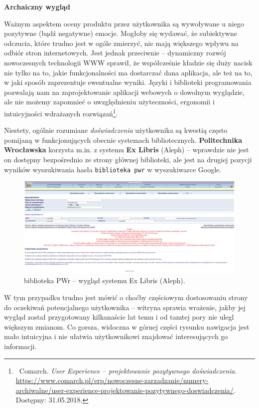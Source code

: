 \documentclass[12pt, a4paper]{article}
\begin{document}
\noindent\textbf{Archaiczny wygląd}\\\vspace{-0.35cm}

Ważnym aspektem oceny produktu przez użytkownika są wywoływane u niego pozytywne (bądź negatywne) emocje. Mogłoby się wydawać, że subiektywne odczucia, które trudno jest w ogóle zmierzyć, nie mają większego wpływu na odbiór stron internetowych. Jest jednak przeciwnie -- dynamiczny rozwój nowoczesnych technologii WWW sprawił, że współcześnie kładzie się duży nacisk nie tylko na to, jakie funkcjonalności ma dostarczać dana aplikacja, ale też na to, w jaki sposób zaprezentuje ewentualne wyniki. Języki i biblioteki programowania pozwalają nam na zaprojektowanie aplikacji webowych o dowolnym wyglądzie, ale nie możemy zapomnieć o uwzględnieniu użyteczności, ergonomii i intuicyjności wdrażanych rozwiązań\footnote{\ Comarch. \textit{User Experience -- projektowanie pozytywnego doświadczenia}.\\\url{https://www.comarch.pl/erp/nowoczesne-zarzadzanie/numery-archiwalne/user-experience-projektowanie-pozytywnego-doswiadczenia/}. Dostępny: 31.05.2018.}. 

Niestety, ogólnie rozumiane \textit{doświadczenia} użytkownika są kwestią często pomijaną w funkcjonujących obecnie systemach bibliotecznych. \textbf{Politechnika Wrocławska} korzysta m.in. z systemu \textbf{Ex Libris} (Aleph) -- wprawdzie nie jest on dostępny bezpośrednio ze strony głównej biblioteki, ale jest na drugiej pozycji wyników wyszukiwania hasła \texttt{biblioteka pwr} w wyszukiwarce Google.

\begin{figure}[h]
    \includegraphics[width=\textwidth]{aleph.png}
    \caption{biblioteka PWr -- wygląd systemu Ex Libris (Aleph).}
\end{figure}

W tym przypadku trudno jest mówić o choćby częściowym dostosowaniu strony do oczekiwań potencjalnego użytkownika -- witryna sprawia wrażenie, jakby jej wygląd został przygotowany kilkanaście lat temu i od tamtej pory nie ulegl większym zmianom. Co gorsza, widoczna w górnej części rysunku nawigacja jest mało intuicyjna i nie ułatwia użytkownikowi znajdować interesujących go informacji.\\
\end{document}
